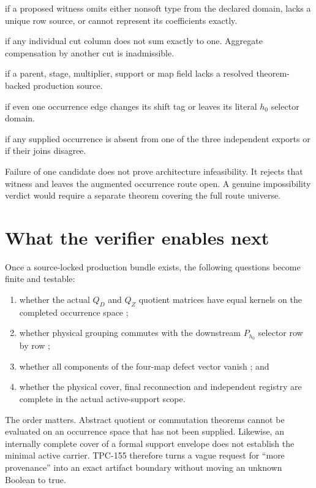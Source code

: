 \documentclass[11pt]{article}
\numberwithin{equation}{section}
\theoremstyle{definition}
\theoremstyle{remark}
\begin{document}
\begin{description}[leftmargin=2.5em,style=nextline]
\item[Schema route fails]
if a proposed witness omits either nonsoft type from the declared
domain, lacks a unique row source, or cannot represent its coefficients
exactly.
\item[Conservation route fails]
if any individual cut column does not sum exactly to one.  Aggregate
compensation by another cut is inadmissible.
\item[Provenance route fails]
if a parent, stage, multiplier, support or map field lacks a resolved
theorem-backed production source.
\item[Fixed-shift route fails]
if even one occurrence edge changes its shift tag or leaves its
literal \(h_0\) selector domain.
\item[Physical-completion route fails]
if any supplied occurrence is absent from one of the three independent
exports or if their joins disagree.
\end{description}

Failure of one candidate does not prove architecture infeasibility.
It rejects that witness and leaves the augmented occurrence route
open.  A genuine impossibility verdict would require a separate
theorem covering the full route universe.

\section{What the verifier enables next}

Once a source-locked production bundle exists, the following questions
become finite and testable:
\begin{enumerate}[label=(\roman*),leftmargin=2.2em]
\item whether the actual \(Q_D\) and \(Q_Z\) quotient matrices have
  equal kernels on the completed occurrence space
  \citep{WangTPC144};
\item whether physical grouping commutes with the downstream
  \(P_{h_0}\) selector row by row \citep{WangTPC145};
\item whether all components of the four-map defect vector vanish
  \citep{WangTPC146}; and
\item whether the physical cover, final reconnection and independent
  registry are complete in the actual active-support scope.
\end{enumerate}

The order matters.  Abstract quotient or commutation theorems cannot
be evaluated on an occurrence space that has not been supplied.
Likewise, an internally complete cover of a formal support envelope
does not establish the minimal active carrier.  TPC-155 therefore
turns a vague request for ``more provenance'' into an exact artifact
boundary without moving an unknown Boolean to true.
\end{document}
